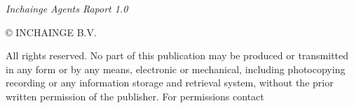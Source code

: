 \null\vfill
\begin{flushleft}
\thispagestyle{empty}
\textit{Inchainge Agents Raport 1.0}

© INCHAINGE B.V. 


\noindent All rights reserved. No part of this publication may be produced or transmitted in any form or by any means, electronic or mechanical, including photocopying recording or any information storage and retrieval system, without the prior written permission of the publisher. For permissions contact 
\end{flushleft}

